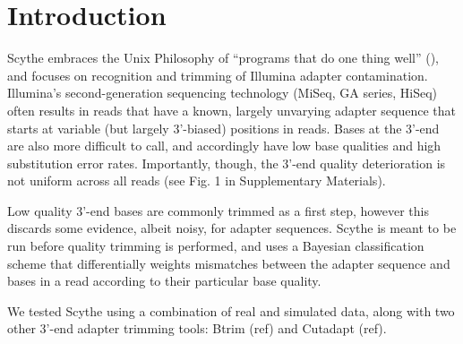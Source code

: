 \documentclass{bioinfo}
\begin{document}
\section{Introduction}
Scythe embraces the Unix Philosophy of ``programs that do one thing
well'' (\citealp{raymond2003}), and focuses on recognition and
trimming of Illumina adapter contamination. Illumina's
second-generation sequencing technology (MiSeq, GA series, HiSeq)
often results in reads that have a known, largely unvarying adapter
sequence that starts at variable (but largely 3'-biased) positions in
reads. Bases at the 3'-end are also more difficult to call, and
accordingly have low base qualities and high substitution error
rates. Importantly, though, the 3'-end quality deterioration is not
uniform across all reads (see Fig. 1 in Supplementary Materials).

Low quality 3'-end bases are commonly trimmed as a first step, however
this discards some evidence, albeit noisy, for adapter
sequences. Scythe is meant to be run before quality trimming is
performed, and uses a Bayesian classification scheme that
differentially weights mismatches between the adapter sequence and
bases in a read according to their particular base quality.

We tested Scythe using a combination of real and simulated data, along
with two other 3'-end adapter trimming tools: Btrim (ref) and Cutadapt
(ref).


\end{document}
